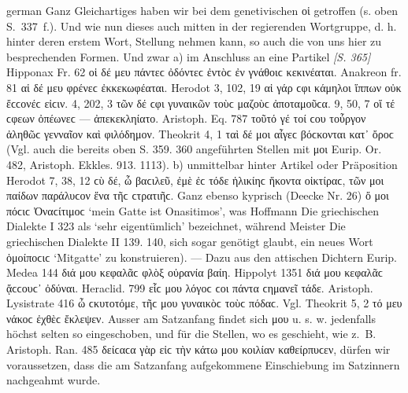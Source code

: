 \begin{otherlanguage*}{german}
Ganz Gleichartiges haben wir bei dem genetivischen οἱ getroffen (s. oben S.~337~f.). Und wie nun dieses auch mitten in der regierenden Wortgruppe, d. h. hinter deren erstem Wort, Stellung nehmen kann, so auch die von uns hier zu besprechenden Formen. Und zwar a) im Anschluss an eine Partikel \hypertarget{p365}{\emph{[S. 365]}}\label{p365} Hipponax Fr. 62 οἱ δέ μευ πάντεϲ ὀδόντεϲ ἐντὸϲ ἐν γνάθοιϲ κεκινέαται. Anakreon fr. 81 αἱ δέ μευ φρένεϲ ἐκκεκωφέαται. Herodot 3, 102, 19 αἱ γάρ ϲφι κάμηλοι ἵππων οὐκ ἔϲϲονέϲ εἰϲιν. 4, 202, 3 τῶν δέ ϲφι γυναικῶν τοὺϲ μαζοὺϲ ἀποταμοῦϲα. 9, 50, 7 οἵ τέ ϲφεων ὀπέωνεϲ — ἀπεκεκληίατο. Aristoph. Eq. 787 τοῦτό γέ τοί ϲου τοὖργον ἀληθῶϲ γενναῖον καὶ φιλόδημον. Theokrit 4, 1 ταὶ δέ μοι αἶγεϲ βόϲκονται κατ᾽ ὄροϲ (Vgl. auch die bereits oben S. 359. 360 angeführten Stellen mit μοι Eurip. Or. 482, Aristoph. Ekkles. 913. 1113). b) unmittelbar hinter Artikel oder Präposition Herodot 7, 38, 12 ϲὺ δέ, ὦ βαϲιλεῦ, ἐμὲ ἐϲ τόδε ἡλικίηϲ ἥκοντα οἰκτίραϲ, τῶν μοι παίδων παράλυϲον ἕνα τῆϲ ϲτρατιῆϲ. Ganz ebenso kyprisch (Deecke Nr. 26) ὄ μοι πόϲιϲ Ὀναϲίτιμοϲ ‘mein Gatte ist Onasitimos’, was Hoffmann Die griechischen Dialekte I 323 als ‘sehr eigentümlich’ bezeichnet, während Meister Die griechischen Dialekte II 139. 140, sich sogar genötigt glaubt, ein neues Wort ὁμοίποϲιϲ ‘Mitgatte’ zu konstruieren). — Dazu aus den attischen Dichtern Eurip. Medea 144 διά μου κεφαλᾶϲ φλὸξ οὐρανία βαίη. Hippolyt 1351 διά μου κεφαλᾶϲ ᾄϲϲουϲ᾽ ὀδύναι. Heraclid. 799 εἷϲ μου λόγοϲ ϲοι πάντα ϲημανεῖ τάδε. Aristoph. Lysistrate 416 ὦ ϲκυτοτόμε, τῆϲ μου γυναικὸϲ τοὺϲ πόδαϲ. Vgl. Theokrit 5, 2 τό μευ νάκοϲ ἐχθὲϲ ἔκλεψεν. Ausser am Satzanfang findet sich μου u. s. w. jedenfalls höchst selten so eingeschoben, und für die Stellen, wo es geschieht, wie z.~B. Aristoph. Ran. 485 δείϲαϲα γὰρ εἰϲ τὴν κάτω μου κοιλίαν καθείρπυϲεν, dürfen wir voraussetzen, dass die am Satzanfang aufgekommene Einschiebung im Satzinnern nachgeahmt wurde.


\end{otherlanguage*}
